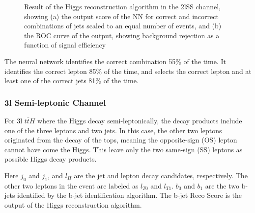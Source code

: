 \begin{figure}[h!]
  \label{fig:higgs2lSSresults}
  \caption{Result of the Higgs reconstruction algorithm in the 2lSS channel, showing (a) the output score of the NN for correct and incorrect combinations of jets scaled to an equal number of events, and (b) the ROC curve of the output, showing background rejection as a function of signal efficiency}
\end{figure} 

The neural network identifies the correct combination 55\% of the time. It identifies the correct lepton 85\% of the time, and selects the correct lepton and at least one of the correct jets 81\% of the time.


\subsubsection{3l Semi-leptonic Channel}
\label{subsec:higgs3lS}

For 3l $t\bar{t}H$ where the Higgs decay semi-leptonically, the decay products include one of the three leptons and two jets. In this case, the other two leptons originated from the decay of the tops, meaning the opposite-sign (OS) lepton cannot have come the Higgs. This leave only the two same-sign (SS) leptons as possible Higgs decay products. 



Here $j_0$ and $j_1$, and $l_H$ are the jet and lepton decay candidates, respectively. The other two leptons in the event are labeled as $l_{T0}$ and $l_{T1}$. $b_0$ and $b_1$ are the two b-jets identified by the b-jet identification algorithm. The b-jet Reco Score is the output of the Higgs reconstruction algorithm. 

